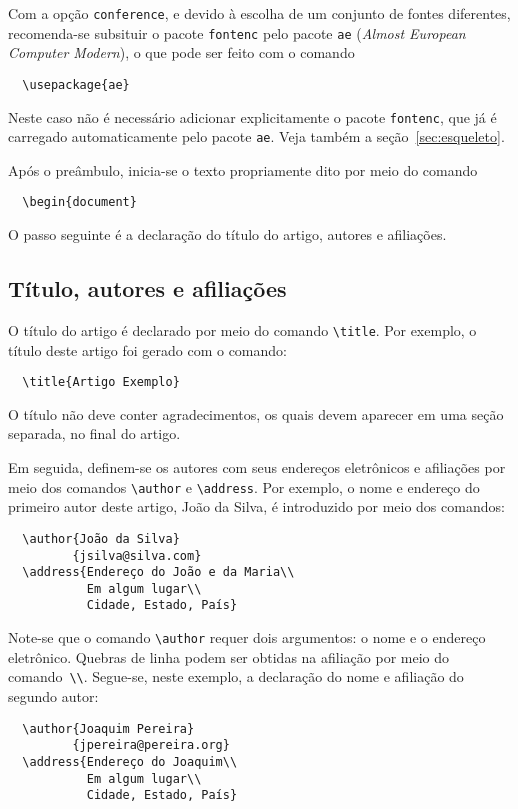 \documentclass[conference,harvard,brazil,english]{sbatex}
\begin{document}
Com a opção \verb+conference+, e devido à escolha de um conjunto de
fontes diferentes, recomenda-se subsituir o pacote \verb+fontenc+ pelo
pacote \verb+ae+ (\emph{Almost European Computer Modern}), o que pode
ser feito com o comando
\begin{verbatim}
  \usepackage{ae}
\end{verbatim}
Neste caso não é necessário adicionar explicitamente o pacote
\verb+fontenc+, que já é carregado automaticamente pelo pacote
\verb+ae+. Veja também a seção~\ref{sec:esqueleto}.

Após o preâmbulo, inicia-se o texto propriamente dito por meio do
comando
\begin{verbatim}
  \begin{document}
\end{verbatim}
O passo seguinte é a declaração do título do artigo, autores e
afiliações.

\subsection{Título, autores e afiliações}

O título do artigo é declarado por meio do comando \verb+\title+. Por
exemplo, o título deste artigo foi gerado com o comando:
\begin{verbatim}
  \title{Artigo Exemplo}
\end{verbatim}
O título não deve conter agradecimentos, os quais devem aparecer em
uma seção separada, no final do artigo.

Em seguida, definem-se os autores com seus endereços eletrônicos e
afiliações por meio dos comandos \verb+\author+ e
\verb+\address+. Por exemplo, o nome e endereço do primeiro autor
deste artigo, João da Silva, é introduzido por meio dos comandos:
\begin{verbatim}
  \author{João da Silva}
         {jsilva@silva.com}
  \address{Endereço do João e da Maria\\
           Em algum lugar\\
           Cidade, Estado, País}
\end{verbatim}
Note-se que o comando \verb+\author+ requer dois argumentos: o nome e
o endereço eletrônico. Quebras de linha podem ser obtidas na afiliação
por meio do comando~\verb+\\+. Segue-se, neste exemplo, a declaração
do nome e afiliação do segundo autor:
\begin{verbatim}
  \author{Joaquim Pereira}
         {jpereira@pereira.org}
  \address{Endereço do Joaquim\\
           Em algum lugar\\
           Cidade, Estado, País}
\end{verbatim}
\end{document}
